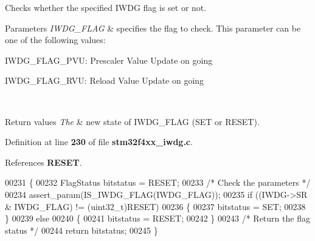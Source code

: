 Checks whether the specified I\+W\+DG flag is set or not. 


\begin{DoxyParams}{Parameters}
{\em I\+W\+D\+G\+\_\+\+F\+L\+AG} & specifies the flag to check. This parameter can be one of the following values\+: \begin{DoxyItemize}
\item I\+W\+D\+G\+\_\+\+F\+L\+A\+G\+\_\+\+P\+VU\+: Prescaler Value Update on going \item I\+W\+D\+G\+\_\+\+F\+L\+A\+G\+\_\+\+R\+VU\+: Reload Value Update on going \end{DoxyItemize}
\\
\hline
\end{DoxyParams}

\begin{DoxyRetVals}{Return values}
{\em The} & new state of I\+W\+D\+G\+\_\+\+F\+L\+AG (S\+ET or R\+E\+S\+ET). \\
\hline
\end{DoxyRetVals}


Definition at line \textbf{ 230} of file \textbf{ stm32f4xx\+\_\+iwdg.\+c}.



References \textbf{ R\+E\+S\+ET}.


\begin{DoxyCode}
00231 \{
00232   FlagStatus bitstatus = RESET;
00233   \textcolor{comment}{/* Check the parameters */}
00234   assert_param(IS_IWDG_FLAG(IWDG\_FLAG));
00235   \textcolor{keywordflow}{if} ((IWDG->SR & IWDG\_FLAG) != (uint32\_t)RESET)
00236   \{
00237     bitstatus = SET;
00238   \}
00239   \textcolor{keywordflow}{else}
00240   \{
00241     bitstatus = RESET;
00242   \}
00243   \textcolor{comment}{/* Return the flag status */}
00244   \textcolor{keywordflow}{return} bitstatus;
00245 \}
\end{DoxyCode}
